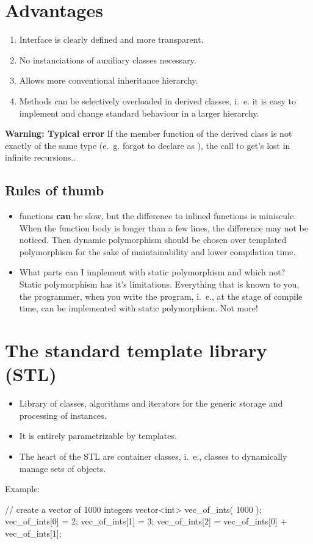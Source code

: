 \section{Advantages}
\begin{enumerate}
\item Interface is clearly defined and more transparent.
\item No instanciations of auxiliary classes necessary.
\item Allows more conventional inheritance hierarchy.
\item Methods can be selectively overloaded in derived classes, i.~e. it is easy to
implement and change standard behaviour in a larger hierarchy.
\end{enumerate}

\textbf{Warning: Typical error} If the member function of the derived class is not exactly of the
same type (e.~g. forgot to declare as ), the call to
 get's lost in infinite recursions..


\subsection{Rules of thumb}

\begin{itemize}
\item {} functions \textbf{can} be slow, but the difference to inlined functions is miniscule. {When the function body is longer than a few lines, the difference may not be noticed.} Then dynamic polymorphism should be chosen over templated polymorphism for the sake of maintainability and lower compilation time.
\item What parts can I implement with static polymorphism and which not? \\
Static polymorphism has it's limitations. Everything that is known to you, the programmer, when you write the program, i.~e., at the stage of compile time, can be implemented with static polymorphism. Not more!
\end{itemize}


\section{The standard template library (STL)}


\begin{itemize}
\item Library of classes, algorithms and iterators for the generic storage and processing of instances.
\item It is entirely parametrizable by templates.
\item The heart of the STL are container classes, i.~e., classes to dynamically manage sets of objects.
\end{itemize}
Example:
\begin{myverbatim}
// create a vector of 1000 integers
vector<int> vec_of_ints( 1000 );
vec_of_ints[0] = 2;
vec_of_ints[1] = 3;
vec_of_ints[2] = vec_of_ints[0] + vec_of_ints[1];
\end{myverbatim}


